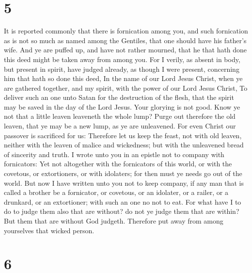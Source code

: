 \hypertarget{section-4}{%
\section{5}\label{section-4}}

 It is reported commonly that there is fornication among
you, and such fornication as is not so much as named among the Gentiles,
that one should have his father's wife.  And ye are puffed
up, and have not rather mourned, that he that hath done this deed might
be taken away from among you.  For I verily, as absent in
body, but present in spirit, have judged already, as though I were
present, concerning him that hath so done this deed,  In the
name of our Lord Jesus Christ, when ye are gathered together, and my
spirit, with the power of our Lord Jesus Christ,  To deliver
such an one unto Satan for the destruction of the flesh, that the spirit
may be saved in the day of the Lord Jesus.  Your glorying is
not good. Know ye not that a little leaven leaveneth the whole lump?
 Purge out therefore the old leaven, that ye may be a new
lump, as ye are unleavened. For even Christ our passover is sacrificed
for us:  Therefore let us keep the feast, not with old
leaven, neither with the leaven of malice and wickedness; but with the
unleavened bread of sincerity and truth.  I wrote unto you
in an epistle not to company with fornicators:  Yet not
altogether with the fornicators of this world, or with the covetous, or
extortioners, or with idolaters; for then must ye needs go out of the
world.  But now I have written unto you not to keep
company, if any man that is called a brother be a fornicator, or
covetous, or an idolater, or a railer, or a drunkard, or an extortioner;
with such an one no not to eat.  For what have I to do to
judge them also that are without? do not ye judge them that are within?
 But them that are without God judgeth. Therefore put away
from among yourselves that wicked person.

\hypertarget{section-5}{%
\section{6}\label{section-5}}

